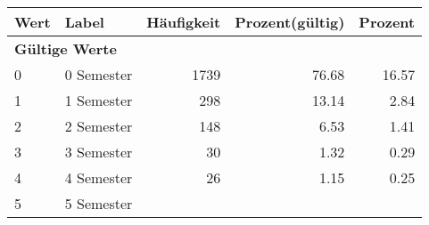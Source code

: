      \begin{longtable}{lXrrr}
     \toprule
     \textbf{Wert} & \textbf{Label} & \textbf{Häufigkeit} & \textbf{Prozent(gültig)} & \textbf{Prozent} \\
     \endhead
     \midrule
     \multicolumn{5}{l}{\textbf{Gültige Werte}}\\

     0 &
     \multicolumn{1}{X}{ 0 Semester   } &


       \num{1739} &
       \num[round-mode=places,round-precision=2]{76,68} &
         \num[round-mode=places,round-precision=2]{16,57} \\

     1 &
     \multicolumn{1}{X}{ 1 Semester   } &


       \num{298} &
       \num[round-mode=places,round-precision=2]{13,14} &
         \num[round-mode=places,round-precision=2]{2,84} \\

     2 &
     \multicolumn{1}{X}{ 2 Semester   } &


       \num{148} &
       \num[round-mode=places,round-precision=2]{6,53} &
         \num[round-mode=places,round-precision=2]{1,41} \\

     3 &
     \multicolumn{1}{X}{ 3 Semester   } &


       \num{30} &
       \num[round-mode=places,round-precision=2]{1,32} &
         \num[round-mode=places,round-precision=2]{0,29} \\

     4 &
     \multicolumn{1}{X}{ 4 Semester   } &


       \num{26} &
       \num[round-mode=places,round-precision=2]{1,15} &
         \num[round-mode=places,round-precision=2]{0,25} \\

     5 &
     \multicolumn{1}{X}{ 5 Semester   } &



\end{longtable}
